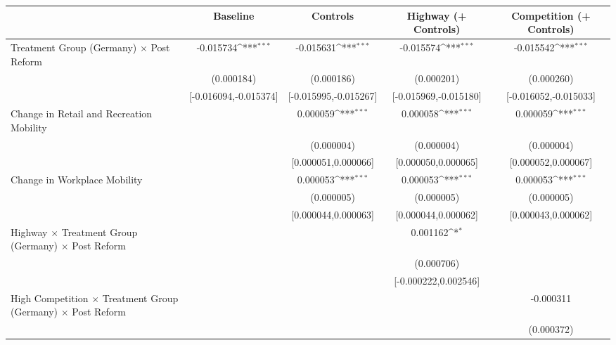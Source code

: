 {
\def\sym#1{\ifmmode^{#1}\else\(^{#1}\)\fi}
\begin{tabular}{l*{4}{c}}
\toprule
                    &\multicolumn{1}{c}{Baseline}&\multicolumn{1}{c}{Controls}&\multicolumn{1}{c}{Highway (+ Controls)}&\multicolumn{1}{c}{Competition (+ Controls)}\\
\midrule
Treatment Group (Germany) $\times$ Post Reform&   -0.015734\sym{***}&   -0.015631\sym{***}&   -0.015574\sym{***}&   -0.015542\sym{***}\\
                    &  (0.000184)         &  (0.000186)         &  (0.000201)         &  (0.000260)         \\
                    &[-0.016094,-0.015374]         &[-0.015995,-0.015267]         &[-0.015969,-0.015180]         &[-0.016052,-0.015033]         \\
Change in Retail and Recreation Mobility&                     &    0.000059\sym{***}&    0.000058\sym{***}&    0.000059\sym{***}\\
                    &                     &  (0.000004)         &  (0.000004)         &  (0.000004)         \\
                    &                     &[0.000051,0.000066]         &[0.000050,0.000065]         &[0.000052,0.000067]         \\
Change in Workplace Mobility&                     &    0.000053\sym{***}&    0.000053\sym{***}&    0.000053\sym{***}\\
                    &                     &  (0.000005)         &  (0.000005)         &  (0.000005)         \\
                    &                     &[0.000044,0.000063]         &[0.000044,0.000062]         &[0.000043,0.000062]         \\
Highway $\times$ Treatment Group (Germany) $\times$ Post Reform&                     &                     &    0.001162\sym{*}  &                     \\
                    &                     &                     &  (0.000706)         &                     \\
                    &                     &                     &[-0.000222,0.002546]         &                     \\
High Competition $\times$ Treatment Group (Germany) $\times$ Post Reform&                     &                     &                     &   -0.000311         \\
                    &                     &                     &                     &  (0.000372)         \\

\end{tabular}}
